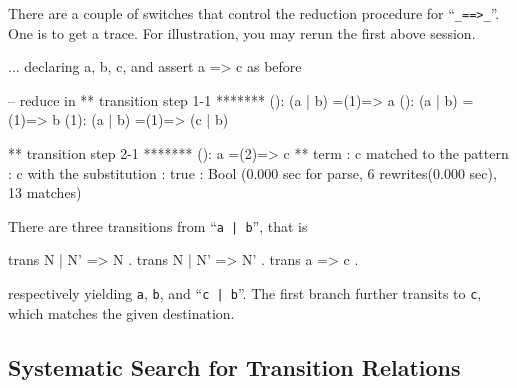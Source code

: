 \documentclass[a4paper]{memoir}
\begin{document}
There are a couple of switches that control the reduction procedure
for ``\verb|_==>_|''. One is to get a trace. For illustration, you may
rerun the first above session.
\begin{vvtm}
\begin{ccode}
  ... declaring a, b, c, and assert a => c as before



  -- reduce in %
  ** transition step 1-1 *******
  (): (a | b)
      =(1)=> a
  (): (a | b)
      =(1)=> b
  (1): (a | b)
      =(1)=> (c | b)

  ** transition step 2-1 *******
  (): a
      =(2)=> c
  ** term : c
   matched to the pattern : c
   with the substitution : {}
  true : Bool
  (0.000 sec for parse, 6 rewrites(0.000 sec), 13 matches)
\end{ccode}
\end{vvtm}
There are three transitions from ``\verb+a | b+'', that is
\begin{vvtm}
\begin{ccode}
  trans N | N' => N .
  trans N | N' => N' .
  trans a => c .
\end{ccode}
\end{vvtm}
respectively yielding \verb|a|, \verb|b|, and ``\verb+c | b+''.
The first branch further transits to \verb|c|, which matches
the given destination.


\subsection{Systematic Search for Transition Relations}
\label{sec:p2-proving-trans-2}
\end{document}
